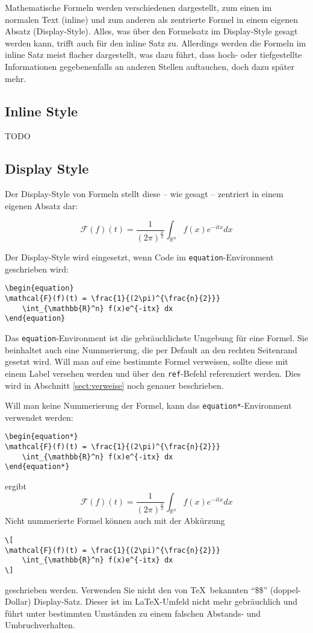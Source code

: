 Mathematische Formeln werden verschiedenen dargestellt, zum einen im normalen Text (inline) und zum anderen als zentrierte Formel in einem eigenen Absatz (Display-Style). Alles, was über den Formelsatz im Display-Style gesagt werden kann, trifft auch für den inline Satz zu. Allerdings werden die Formeln im inline Satz meist flacher dargestellt, was dazu führt, dass hoch- oder tiefgestellte Informationen gegebenenfalls an anderen Stellen auftauchen, doch dazu später mehr.

\subsection{Inline Style} \label{sec:inline}
TODO

\subsection{Display Style}
Der Display-Style von Formeln stellt diese -- wie gesagt -- zentriert in einem eigenen Absatz dar:

\begin{equation}
\mathcal{F}(f)(t) = \frac{1}{(2\pi)^{\frac{n}{2}}} 
	\int_{\mathbb{R}^n} f(x)e^{-itx} dx
\end{equation}

Der Display-Style wird eingesetzt, wenn Code im \texttt{equation}-Environment geschrieben wird:
\begin{verbatim}
\begin{equation}
\mathcal{F}(f)(t) = \frac{1}{(2\pi)^{\frac{n}{2}}} 
	\int_{\mathbb{R}^n} f(x)e^{-itx} dx
\end{equation}
\end{verbatim}
Das \texttt{equation}-Environment ist die gebräuchlichste Umgebung für eine Formel. Sie beinhaltet auch eine Nummerierung, die per Default an den rechten Seitenrand gesetzt wird. Will man auf eine bestimmte Formel verweisen, sollte diese mit einem Label versehen werden und über den \texttt{ref}-Befehl referenziert werden. Dies wird in Abschnitt \ref{sect:verweise} noch genauer beschrieben.

Will man keine Nummerierung der Formel, kann das \texttt{equation*}-En\-vi\-ron\-ment verwendet werden:
\begin{verbatim}
\begin{equation*}
\mathcal{F}(f)(t) = \frac{1}{(2\pi)^{\frac{n}{2}}} 
	\int_{\mathbb{R}^n} f(x)e^{-itx} dx
\end{equation*}
\end{verbatim}
ergibt
\begin{equation*}
\mathcal{F}(f)(t) = \frac{1}{(2\pi)^{\frac{n}{2}}} 
	\int_{\mathbb{R}^n} f(x)e^{-itx} dx
\end{equation*}
Nicht nummerierte Formel können auch mit der Abkürzung
\begin{verbatim}
\[
\mathcal{F}(f)(t) = \frac{1}{(2\pi)^{\frac{n}{2}}} 
	\int_{\mathbb{R}^n} f(x)e^{-itx} dx
\]
\end{verbatim}
geschrieben werden. Verwenden Sie nicht den von \TeX\ bekannten "`\$\$"' (doppel-Dollar) Display-Satz. Dieser ist im \LaTeX-Umfeld nicht mehr gebräuchlich und führt unter bestimmten Umständen zu einem falschen Abstands- und Umbruchverhalten.

